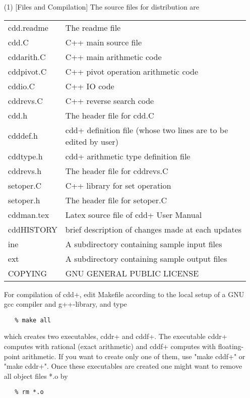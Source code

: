 \begin{itemize}
\item[(1)] [Files and Compilation] The source files for distribution are

\begin{tabular}{ll}
     cdd.readme  & The readme file\\
     cdd.C       & C++ main source file\\
     cddarith.C  & C++ main arithmetic code\\
     cddpivot.C  & C++ pivot operation arithmetic code\\
     cddio.C     & C++ IO code\\ 
     cddrevs.C   & C++ reverse search code\\ 
     cdd.h       & The header file for cdd.C\\
     cdddef.h    & cdd+ definition file (whose two lines are to be edited by user)\\
     cddtype.h   & cdd+ arithmetic type definition file\\
     cddrevs.h   & The header file for cddrevs.C\\
     setoper.C   & C++ library for set operation\\
     setoper.h   & The header file for setoper.C \\
     cddman.tex  & Latex source file of cdd+ User Manual\\
     cddHISTORY  & brief description of changes made at each updates\\
     ine         & A subdirectory containing sample input files\\
     ext         & A subdirectory containing sample output files\\
     COPYING     & GNU GENERAL PUBLIC LICENSE\\
\end{tabular}

\noindent
For compilation of cdd+, edit Makefile according to the local
setup of a GNU gcc compiler and g++-library, and type
\begin{verbatim}
   % make all
\end{verbatim}
which creates two executables, cddr+ and cddf+.  The executable
cddr+ computes with rational (exact arithmetic) and cddf+ computes
with floating-point arithmetic.  If you want to create only one of
them, use "make cddf+" or "make cddr+".  Once these executables are 
created one might want to remove all object files *.o by
\begin{verbatim}
   % rm *.o
\end{verbatim}


\end{itemize}
